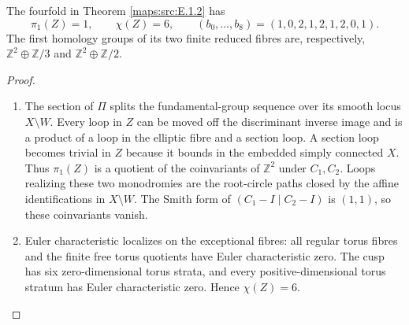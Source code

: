 \begin{theorem}\label{maps:src:E.1.4}


The fourfold in Theorem \ref{maps:src:E.1.2} has
\[
 \pi_1(Z)=1,\qquad \chi(Z)=6,\qquad
 (b_0,\ldots,b_8)=(1,0,2,1,2,1,2,0,1).
 \tag{E.8}\label{maps:eq:E.8}
\]
The first homology groups of its two finite reduced fibres are,
respectively, $\mathbb Z^2\oplus\mathbb Z/3$ and
$\mathbb Z^2\oplus\mathbb Z/2$.

\end{theorem}


\begin{proof}
\begin{enumerate}[label=\arabic*.,leftmargin=*]
\item The section of $\Pi$ splits the fundamental-group sequence over its
smooth locus $X\setminus W$.  Every loop in $Z$ can be moved off
the discriminant inverse image and is a product of a loop in the
elliptic fibre and a section loop.  A section loop becomes trivial
in $Z$ because it bounds in the embedded simply connected $X$.
Thus $\pi_1(Z)$ is a quotient of the coinvariants of
$\mathbb Z^2$ under $C_1,C_2$.  Loops realizing these two
monodromies are the root-circle paths closed by the affine
identifications in $X\setminus W$.  The Smith form of
$(C_1-I\mid C_2-I)$ is $(1,1)$, so these coinvariants vanish.

\item Euler characteristic localizes on the exceptional fibres: all
regular torus fibres and the finite free torus quotients have Euler
characteristic zero.  The cusp has six zero-dimensional torus
strata, and every positive-dimensional torus stratum has Euler
characteristic zero.  Hence $\chi(Z)=6$.


\end{enumerate}
\end{proof}
